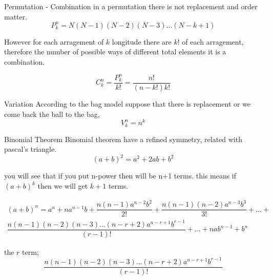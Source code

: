 \documentclass{beamer}
\begin{document}
\begin{frame}{Permutation - Combination}
in a permutation there is not replacement and  order matter.
\begin{equation}
P^{n}_{k} = N(N-1)(N-2)(N-3)...(N-k+1)
\end{equation}

However for each arragement of $k$ longitude there are $k!$ of each arragement, therefore the number of possible ways of different total elements  it is a combination.

\begin{equation}
C^{n}_{k}= \frac{P^{n}_{k}}{k!} = \frac{n!}{(n-k!)k!}
\end{equation}
\end{frame}

\begin{frame}{Variation}
According to the bag model suppose that there is replacement or we come back the ball to the bag, 
\begin{equation}
V^{n}_{k}=n^{k}
\end{equation}
\end{frame}


\begin{frame}{Binomial Theorem}
Binomial theorem have a  refined symmetry, related with pascal's triangle. 
$$(a+b)^2 = a^2 +2ab+b^2$$

 you will see that if you put n-power then will be n+1 terms. this  means if $(a+b)^k$ then we will get $k+1$ terms. 

\begin{eqnarray}
 \nonumber (a+b)^n= a^n+na^{n-1}b+\dfrac{n(n-1)a^{n-2}b^2}{2!}+\dfrac{n(n-1)(n-2)a^{n-3}b^3}{3!}+...+  \\  \dfrac{n(n-1)(n-2)(n-3)...(n-r+2)a^{n-r+1}b^{r-1}}{(r-1)!}+...+nab^{n-1}+b^{n}
\end{eqnarray}

the $r$ term;
\begin{equation}
\dfrac{n(n-1)(n-2)(n-3)...(n-r+2)a^{n-r+1}b^{r-1}}{(r-1)!}
\end{equation}


\end{frame}
\end{document}
